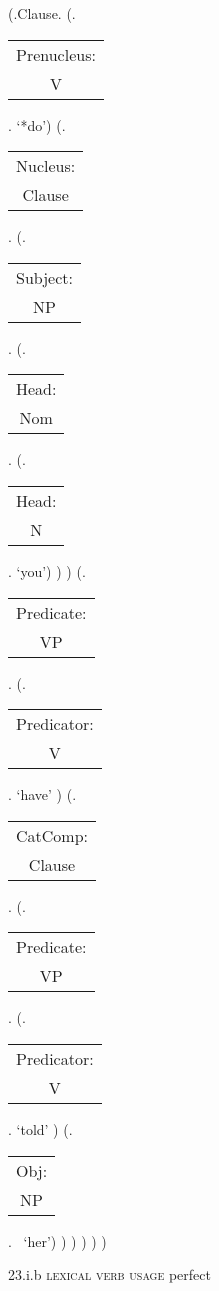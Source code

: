 \documentclass[12pt,letterpaper]{article}
\begin{document}
\begin{figure}
	\begin{center}
		\begin{parsetree}
			(.Clause.
			(.\begin{tabular}{c}Prenucleus:\\V\end{tabular}. `*do')
			(.\begin{tabular}{c}Nucleus:\\Clause\end{tabular}.    
			(.\begin{tabular}{c}Subject:\\NP\end{tabular}.  
			(.\begin{tabular}{c}Head:\\Nom\end{tabular}.
			(.\begin{tabular}{c}Head:\\N\end{tabular}. `you')
			)
			)
			(.\begin{tabular}{c}Predicate:\\VP\end{tabular}.
			(.\begin{tabular}{c}Predicator:\\V\end{tabular}.    `have' )
			(.\begin{tabular}{c}CatComp:\\Clause\end{tabular}.
			(.\begin{tabular}{c}Predicate:\\VP\end{tabular}.
			(.\begin{tabular}{c}Predicator:\\V\end{tabular}. `told' )
			(.\begin{tabular}{c}Obj:\\NP\end{tabular}.  ~`her')
			)
			)
			)
			)
			)
			
		\end{parsetree}
		\hfill \break \hfill \break
		23.i.b \textsc{lexical verb usage} perfect
	\end{center}
\end{figure}
\end{document}
